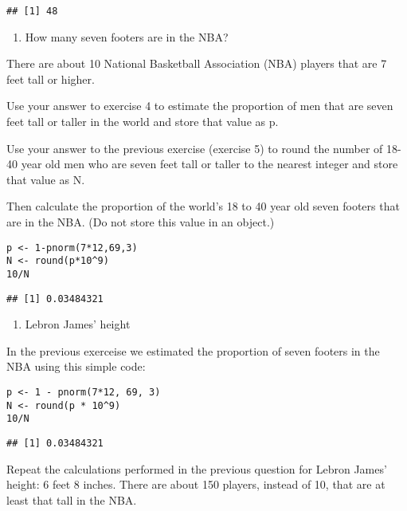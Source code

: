 \documentclass[]{article}
\providecommand{\tightlist}{%
  \setlength{\itemsep}{0pt}\setlength{\parskip}{0pt}}
\begin{document}
\begin{verbatim}
## [1] 48
\end{verbatim}

\begin{enumerate}
\def\labelenumi{\arabic{enumi}.}
\setcounter{enumi}{5}
\tightlist
\item
  How many seven footers are in the NBA?
\end{enumerate}

There are about 10 National Basketball Association (NBA) players that
are 7 feet tall or higher.

Use your answer to exercise 4 to estimate the proportion of men that are
seven feet tall or taller in the world and store that value as p.

Use your answer to the previous exercise (exercise 5) to round the
number of 18-40 year old men who are seven feet tall or taller to the
nearest integer and store that value as N.

Then calculate the proportion of the world's 18 to 40 year old seven
footers that are in the NBA. (Do not store this value in an object.)

\begin{verbatim}
p <- 1-pnorm(7*12,69,3)
N <- round(p*10^9)
10/N
\end{verbatim}

\begin{verbatim}
## [1] 0.03484321
\end{verbatim}

\begin{enumerate}
\def\labelenumi{\arabic{enumi}.}
\setcounter{enumi}{6}
\tightlist
\item
  Lebron James' height
\end{enumerate}

In the previous exerceise we estimated the proportion of seven footers
in the NBA using this simple code:

\begin{verbatim}
p <- 1 - pnorm(7*12, 69, 3)  
N <- round(p * 10^9)  
10/N  
\end{verbatim}

\begin{verbatim}
## [1] 0.03484321
\end{verbatim}

Repeat the calculations performed in the previous question for Lebron
James' height: 6 feet 8 inches. There are about 150 players, instead of
10, that are at least that tall in the NBA.
\end{document}

